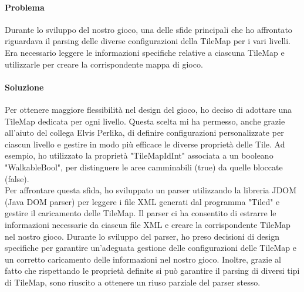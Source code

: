 \documentclass[a4paper,12pt]{report}
\begin{document}
\paragraph{Problema}
Durante lo sviluppo del nostro gioco, una delle sfide principali che ho affrontato riguardava il parsing delle diverse configurazioni della TileMap per i vari livelli. 
Era necessario leggere le informazioni specifiche relative a ciascuna TileMap e utilizzarle per creare la corrispondente mappa di gioco.
\paragraph{Soluzione}
Per ottenere maggiore flessibilità nel design del gioco, ho deciso di adottare una TileMap dedicata per ogni livello. 
Questa scelta mi ha permesso, anche grazie all'aiuto del collega Elvis Perlika, di definire configurazioni personalizzate per ciascun livello e gestire in modo più efficace le diverse proprietà delle Tile.
Ad esempio, ho utilizzato la proprietà "TileMapIdInt" associata a un booleano "WalkableBool", per distinguere le aree camminabili (true) da quelle bloccate (false).
\\
Per affrontare questa sfida, ho sviluppato un parser utilizzando la libreria JDOM (Java DOM parser) per leggere i file XML generati dal programma "Tiled" e gestire il caricamento delle TileMap.
Il parser ci ha consentito di estrarre le informazioni necessarie da ciascun file XML e creare la corrispondente TileMap nel nostro gioco.
Durante lo sviluppo del parser, ho preso decisioni di design specifiche per garantire un'adeguata gestione delle configurazioni delle TileMap e un corretto caricamento delle informazioni nel nostro gioco.
Inoltre, grazie al fatto che rispettando le proprietà definite si può garantire il parsing di diversi tipi di TileMap, sono riuscito a ottenere un riuso parziale del parser stesso.
\end{document}
